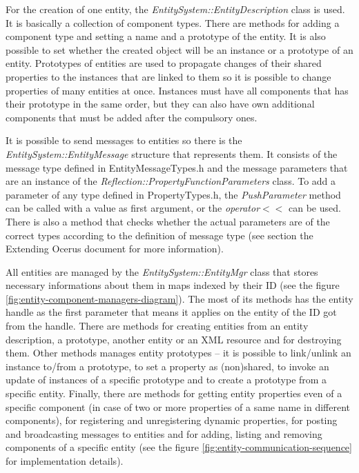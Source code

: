 \documentclass[a4paper, 12pt]{report}
\begin{document}
For the creation of one entity, the \emph{EntitySystem::EntityDescription} class is used. It is basically a collection of component types. There are methods for adding a component type and setting a name and a prototype of the entity. It is also possible to set whether the created object will be an instance or a prototype of an entity. Prototypes of entities are used to propagate changes of their shared properties to the instances that are linked to them so it is possible to change properties of many entities at once. Instances must have all components that has their prototype in the same order, but they can also have own additional components that must be added after the compulsory ones.

It is possible to send messages to entities so there is the \emph{EntitySystem::EntityMessage} structure that represents them. It consists of the message type defined in EntityMessageTypes.h and the message parameters that are an instance of the \emph{Reflection::PropertyFunctionParameters} class. To add a parameter of any type defined in PropertyTypes.h, the \emph{PushParameter} method can be called with a value as first argument, or the \emph{operator}$<<$ can be used. There is also a method that checks whether the actual parameters are of the correct types according to the definition of message type (see section the Extending Ocerus document for more information).

All entities are managed by the \emph{EntitySystem::EntityMgr} class that stores necessary informations about them in maps indexed by their ID (see the figure \ref{fig:entity-component-managers-diagram}). The most of its methods has the entity handle as the first parameter that means it applies on the entity of the ID got from the handle. There are methods for creating entities from an entity description, a prototype, another entity or an XML resource and for destroying them. Other methods manages entity prototypes -- it is possible to link/unlink an instance to/from a prototype, to set a property as (non)shared, to invoke an update of instances of a specific prototype and to create a prototype from a specific entity. Finally, there are methods for getting entity properties even of a specific component (in case of two or more properties of a same name in different components), for registering and unregistering dynamic properties, for posting and broadcasting messages to entities and for adding, listing and removing components of a specific entity (see the figure \ref{fig:entity-communication-sequence} for implementation details).
\end{document}

